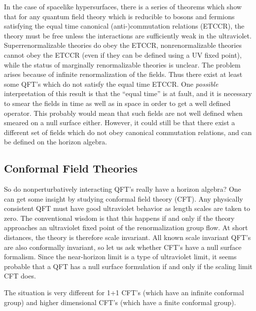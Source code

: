 \documentclass[12pt]{article}
\begin{document}
In the case of spacelike hypersurfaces, there is a series of theorems \cite{powers67} which show that for any quantum field theory which is reducible to bosons and fermions satisfying the equal time canonical (anti-)commutation relations (ETCCR), the theory must be free unless the interactions are sufficiently weak in the ultraviolet.  Superrenormalizable theories do obey the ETCCR, nonrenormalizable theories cannot obey the ETCCR (even if they can be defined using a UV fixed point), while the status of marginally renormalizable theories is unclear.  The problem arises because of infinite renormalization of the fields.  Thus there exist at least some QFT's which do not satisfy the equal time ETCCR.  One \emph{possible} interpretation of this result is that the ``equal time'' is at fault, and it is necessary to smear the fields in time as well as in space in order to get a well defined operator.  This probably would mean that such fields are not well defined when smeared on a null surface either.  However, it could still be that there exist a different set of fields which do not obey canonical commutation relations, and can be defined on the horizon algebra.

\subsection{Conformal Field Theories}\label{nonpert}

So do nonperturbatively interacting QFT's really have a horizon algebra?  One can get some insight by studying conformal field theory (CFT).  Any physically consistent QFT must have good ultraviolet behavior as length scales are taken to zero.  The conventional wisdom is that this happens if and only if the theory approaches an ultraviolet fixed point of the renormalization group flow.  At short distances, the theory is therefore scale invariant.  All known scale invariant QFT's are also conformally invariant, so let us ask whether CFT's have a null surface formalism.  Since the near-horizon limit is a type of ultraviolet limit, it seems probable that a QFT has a null surface formulation if and only if the scaling limit CFT does.

The situation is very different for 1+1 CFT's (which have an infinite conformal group) and higher dimensional CFT's (which have a finite conformal group).
\end{document}
